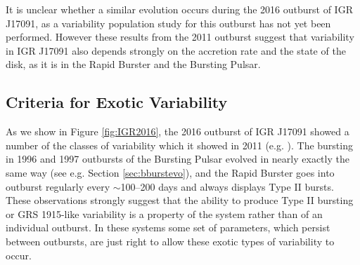 It is unclear whether a similar evolution occurs during the 2016 outburst of IGR J17091, as a variability population study for this outburst has not yet been performed.  However these results from the 2011 outburst suggest that variability in IGR J17091 also depends strongly on the accretion rate and the state of the disk, as it is in the Rapid Burster and the Bursting Pulsar.

\subsection{Criteria for Exotic Variability}

\par As we show in Figure \ref{fig:IGR2016}, the 2016 outburst of IGR J17091 showed a number of the classes of variability which it showed in 2011 (e.g. \citealp{Reynolds_2016HB}).  The bursting in 1996 and 1997 outbursts of the Bursting Pulsar evolved in nearly exactly the same way (see e.g. Section \ref{sec:bburstevo}), and the Rapid Burster goes into outburst regularly every $\sim$100--200 days and always displays Type II bursts.  These observations strongly suggest that the ability to produce Type II bursting or GRS 1915-like variability is a property of the system rather than of an individual outburst.  In these systems some set of parameters, which persist between outbursts, are just right to allow these exotic types of variability to occur.

